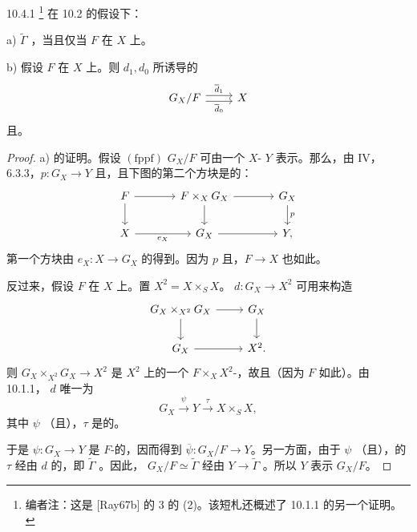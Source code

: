 \begin{SGAresult}{}{10.4.1}
\footnote{编者注：这是 [Ray67b] 的 3 的 (2)。该短札还概述了 10.1.1 的另一个证明。}
在 10.2 的假设下：

a) $\widetilde\Gamma$ ，当且仅当 $F$ 在 $X$ 上。

b) 假设 $F$ 在 $X$ 上。则 $d_1,d_0$ 所诱导的
\[
\begin{tikzcd}
G_X/F\arrow[r,shift left=.6ex,"\overline d_1"]\arrow[r,shift right=.6ex,"\overline d_0"']&X
\end{tikzcd}
\]
且。
\end{SGAresult}
\begin{proof}
a) 的证明。假设 $(\mathrm{fppf})$  $G_X/F$ 可由一个 $X$- $Y$ 表示。那么，由 IV，6.3.3，$p:G_X\to Y$ 且，且下图的第二个方块是的：
\[
\begin{tikzcd}[column sep=large]
F\arrow[r]\arrow[d]&F\times_XG_X\arrow[r]\arrow[d]&G_X\arrow[d,"p"]\\
X\arrow[r,"e_X"']&G_X\arrow[r]&Y,
\end{tikzcd}
\]
第一个方块由 $e_X:X\to G_X$ 的得到。因为 $p$ 且，$F\to X$ 也如此。

反过来，假设 $F$ 在 $X$ 上。置 $X^2=X\times_SX$。 $d:G_X\to X^2$ 可用来构造
\[
\begin{tikzcd}
G_X\times_{X^2}G_X\arrow[r]\arrow[d]&G_X\arrow[d]\\
G_X\arrow[r]&X^2.
\end{tikzcd}
\]
则 $G_X\times_{X^2}G_X\to X^2$ 是 $X^2$ 上的一个 $F\times_XX^2$-，故且（因为 $F$ 如此）。由 10.1.1， $d$ 唯一为
\[
G_X\xrightarrow{\psi}Y\xrightarrow{\tau}X\times_SX,
\]
其中 $\psi$ （且），$\tau$ 是的。

于是 $\psi:G_X\to Y$ 是 $F$-的，因而得到 $\overline\psi:G_X/F\to Y$。另一方面，由于 $\psi$ （且），的 $\tau$ 经由 $d$ 的，即 $\widetilde\Gamma$ 。因此， $G_X/F\simeq\widetilde\Gamma$ 经由 $Y\to\widetilde\Gamma$ 。所以 $Y$ 表示 $G_X/F$。


\end{proof}
